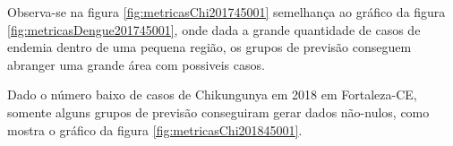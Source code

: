 Observa-se na figura \ref{fig:metricasChi201745001} semelhança ao gráfico da figura \ref{fig:metricasDengue201745001}, onde dada a grande quantidade de casos de endemia dentro de uma pequena região, os grupos de previsão conseguem abranger uma grande área com possiveis casos.
\begin{figure}[!ht]
	\centering	
\end{figure}
\FloatBarrier

Dado o número baixo de casos de Chikungunya em 2018 em Fortaleza-CE, somente alguns grupos de previsão conseguiram gerar dados não-nulos, como mostra o gráfico da figura \ref{fig:metricasChi201845001}.
\begin{figure}[!ht]
	\centering	
\end{figure}
\FloatBarrier
